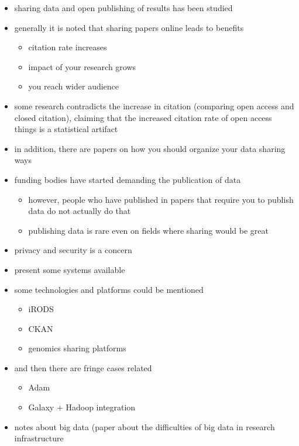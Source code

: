 \begin{itemize}
    \item sharing data and open publishing of results has been studied
    \item generally it is noted that sharing papers online leads to benefits
    \begin{itemize}
        \item citation rate increases
        \item impact of your research grows
        \item you reach wider audience
    \end{itemize}
    \item some research contradicts the increase in citation (comparing open
          access and closed citation), claiming that the increased citation
          rate of open access things is a statistical artifact
    \item in addition, there are papers on how you should organize your data
          sharing ways
    \item funding bodies have started demanding the publication of data
    \begin{itemize}
        \item however, people who have published in papers that require you
              to publish data do not actually do that
        \item publishing data is rare even on fields where sharing would be
              great
    \end{itemize}
    \item privacy and security is a concern
    \item present some systems available
    \item some technologies and platforms could be mentioned
    \begin{itemize}
        \item iRODS
        \item CKAN
        \item genomics sharing platforms
    \end{itemize}
    \item and then there are fringe cases related
    \begin{itemize}
        \item Adam
        \item Galaxy + Hadoop integration
    \end{itemize}
    \item notes about big data (paper about the difficulties of big data in
          research infrastructure
\end{itemize}

